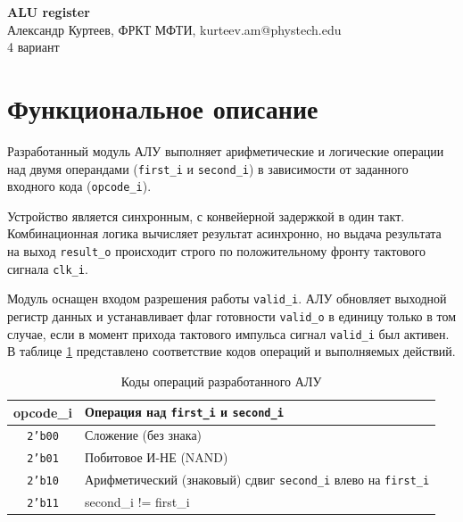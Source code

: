 \documentclass[12pt, a4paper]{article}
\begin{document}
\noindent
\textbf{ALU register}\\
Александр Куртеев, ФРКТ МФТИ, kurteev.am@phystech.edu\\
4 вариант \\

\vspace{1em}

\tableofcontents

\vspace{2em}

\section{Функциональное описание}
Разработанный модуль АЛУ выполняет арифметические и логические операции над двумя операндами (\texttt{first\_i} и \texttt{second\_i}) в зависимости от заданного входного кода (\texttt{opcode\_i}). 

Устройство является синхронным, с конвейерной задержкой в один такт. Комбинационная логика вычисляет результат асинхронно, но выдача результата на выход \texttt{result\_o} происходит строго по положительному фронту тактового сигнала \texttt{clk\_i}. 

Модуль оснащен входом разрешения работы \texttt{valid\_i}. АЛУ обновляет выходной регистр данных и устанавливает флаг готовности \texttt{valid\_o} в единицу только в том случае, если в момент прихода тактового импульса сигнал \texttt{valid\_i} был активен. В таблице \ref{tab:opcode} представлено соответствие кодов операций и выполняемых действий.

\begin{table}[h]
\centering
\label{tab:opcode}
\vspace{0.5em}
\begin{tabular}{|c|l|}
\hline
\textbf{opcode\_i} & \textbf{Операция над \texttt{first\_i} и \texttt{second\_i}} \\ \hline
\texttt{2'b00} & Сложение (без знака) \\ \hline
\texttt{2'b01} & Побитовое И-НЕ (NAND) \\ \hline
\texttt{2'b10} & Арифметический (знаковый) сдвиг \texttt{second\_i} влево на \texttt{first\_i} \\ \hline
\texttt{2'b11} & second\_i != first\_i \\ \hline
\end{tabular}
\caption{Коды операций разработанного АЛУ}
\end{table}

\newpage
\end{document}
